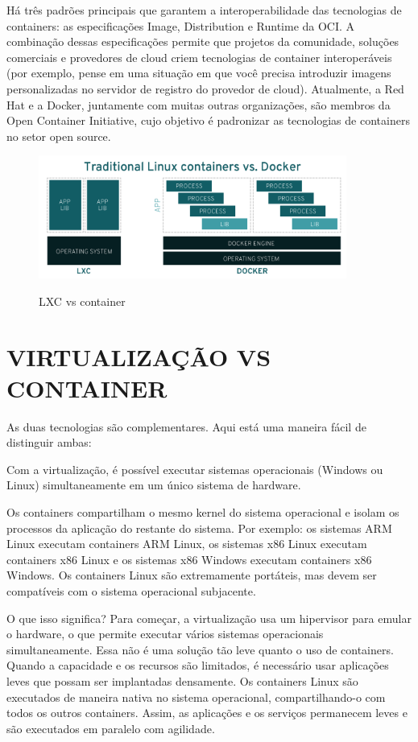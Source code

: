 Há três padrões principais que garantem a interoperabilidade das tecnologias de containers: as especificações Image, Distribution e Runtime da OCI. A combinação dessas especificações permite que projetos da comunidade, soluções comerciais e provedores de cloud criem tecnologias de container interoperáveis (por exemplo, pense em uma situação em que você precisa introduzir imagens personalizadas no servidor de registro do provedor de cloud). Atualmente, a Red Hat e a Docker, juntamente com muitas outras organizações, são membros da Open Container Initiative, cujo objetivo é padronizar as tecnologias de containers no setor open source.

\begin{figure}[!htb]
	\centering
	\caption{LXC vs container}
	\includegraphics[width=0.9\textwidth]{figuras/traditional-linux-containers-vs-docker_0.png}
	\label{fig:lxc-vs-containers}
\end{figure}

\section{VIRTUALIZAÇÃO VS CONTAINER}
\label{sec:virtualização-vs-container}
As duas tecnologias são complementares. Aqui está uma maneira fácil de distinguir ambas:

Com a virtualização, é possível executar sistemas operacionais (Windows ou Linux) simultaneamente em um único sistema de hardware.

Os containers compartilham o mesmo kernel do sistema operacional e isolam os processos da aplicação do restante do sistema. Por exemplo: os sistemas ARM Linux executam containers ARM Linux, os sistemas x86 Linux executam containers x86 Linux e os sistemas x86 Windows executam containers x86 Windows. Os containers Linux são extremamente portáteis, mas devem ser compatíveis com o sistema operacional subjacente.

O que isso significa? Para começar, a virtualização usa um hipervisor para emular o hardware, o que permite executar vários sistemas operacionais simultaneamente. Essa não é uma solução tão leve quanto o uso de containers. Quando a capacidade e os recursos são limitados, é necessário usar aplicações leves que possam ser implantadas densamente. Os containers Linux são executados de maneira nativa no sistema operacional, compartilhando-o com todos os outros containers. Assim, as aplicações e os serviços permanecem leves e são executados em paralelo com agilidade.

